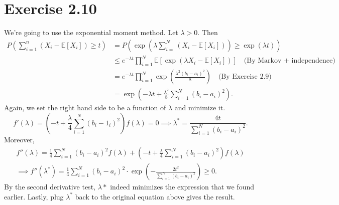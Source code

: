 \section*{Exercise 2.10}
We're going to use the exponential moment method. Let $\lambda > 0$. Then 
\begin{align*}
	P \left( \sum_{i = 1}^{n} (X_i - \mathbb{E}\left[ X_i \right]) \geq t \right) 
	&= P \left( \exp{\left( \lambda \sum_{i = }^{N}(X_i - \mathbb{E}\left[ X_i \right]) \right)} 
	\geq \exp{(\lambda t)} \right) \\
	&\leq e^{-\lambda t} \prod_{i = 1}^{N} \mathbb{E}\left[ \exp{(\lambda X_i - \mathbb{E}\left[ X_i
	\right])} \right] \quad \text{(By Markov + independence)} \\
	&= e^{-\lambda t} \prod_{i = 1}^{N} \exp{\left( \frac{\lambda^2 (b_i - a_i)^2}{8} \right)} 
	\quad \text{(By Exercise 2.9)} \\
	&= \exp{\left( -\lambda t + \frac{\lambda^2}{8}\sum_{i = 1}^{N} (b_i - a_i)^2 \right)}.
\end{align*}
Again, we set the right hand side to be a function of $\lambda$ and minimize it. 
\[ f'(\lambda) = \left( -t + \frac{\lambda}{4}\sum_{i = 1}^{N}(b_i - 1_i)^2 \right)f(\lambda) = 0 
\implies \lambda^* = \frac{4t}{\sum_{i = 1}^{N}(b_i - a_i)^2}. \]
Moreover, 
\begin{align*}
	f''(\lambda) = \frac{1}{4}\sum_{i = 1}^{N}(b_i - a_i)^2 f(\lambda) 
	+ \left( -t + \frac{\lambda}{4}\sum_{i = 1}^{N}(b_i - a_i)^2 \right) f(\lambda) \\
	\implies f''(\lambda^*) = \frac{1}{4}\sum_{i = 1}^{N}(b_i - a_i)^2 \cdot 
	\exp{\left( -\frac{2t^2}{\sum_{i = 1}^{N}(b_i - a_i)^2} \right)} \geq 0. 
\end{align*}
By the second derivative test, $\lambda*$ indeed minimizes the expression that we found earlier. Lastly, plug 
$\lambda^*$ back to the original equation above gives the result.


\newpage
